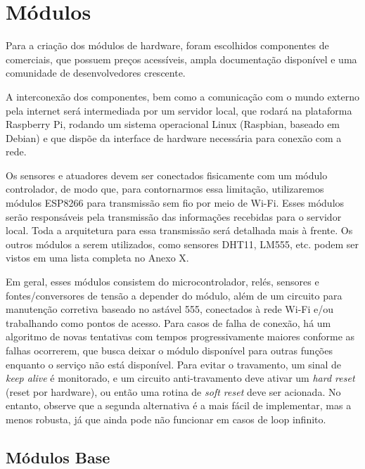 \section{Módulos}
Para a criação dos módulos de hardware, foram escolhidos componentes de \wiot{} comerciais, que possuem preços acessíveis, ampla documentação disponível e uma comunidade de desenvolvedores crescente.

A interconexão dos componentes, bem como a comunicação com o mundo externo pela internet será intermediada por um servidor local, que rodará na plataforma Raspberry Pi, rodando um sistema operacional Linux (Raspbian, baseado em Debian) e que dispõe da interface de hardware necessária para conexão com a rede.

Os sensores e atuadores devem ser conectados fisicamente com um módulo controlador, de modo que, para contornarmos essa limitação, utilizaremos módulos ESP8266 para transmissão sem fio por meio de Wi-Fi. Esses módulos serão responsáveis pela transmissão das informações recebidas para o servidor local. Toda a arquitetura para essa transmissão será detalhada mais à frente. Os outros módulos a serem utilizados, como sensores DHT11, LM555, etc. podem ser vistos em uma lista completa no Anexo X. %

Em geral, esses módulos consistem do microcontrolador, relés, sensores e fontes/conversores de tensão a depender do módulo, além de um circuito para manutenção corretiva baseado no astável 555, conectados à rede Wi-Fi e/ou trabalhando como pontos de acesso. Para casos de falha de conexão, há um algoritmo de novas tentativas com tempos progressivamente maiores conforme as falhas ocorrerem, que busca deixar o módulo disponível para outras funções enquanto o serviço não está disponível. Para evitar o travamento, um sinal de \textit{keep alive} é monitorado, e um circuito anti-travamento deve ativar um \textit{hard reset} (reset por hardware), ou então uma rotina de \textit{soft reset} deve ser acionada. No entanto, observe que a segunda alternativa é a mais fácil de implementar, mas a menos robusta, já que ainda pode não funcionar em casos de loop infinito.

\subsection{Módulos Base}
